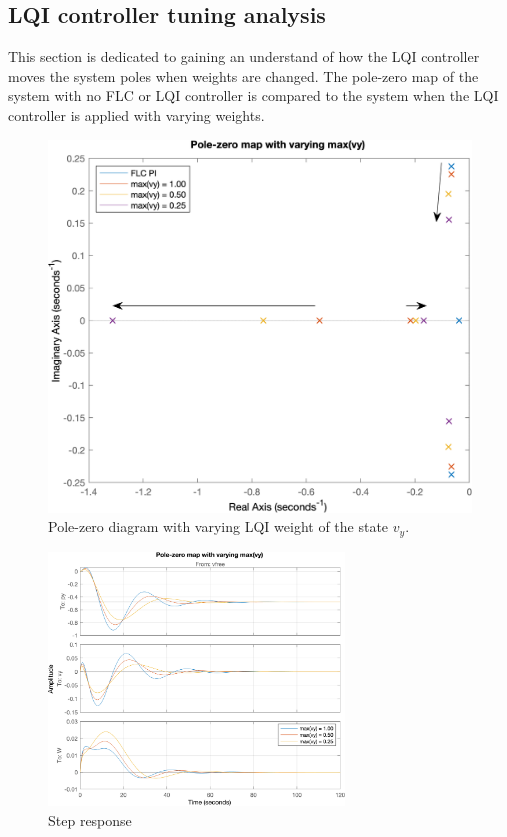 \subsection{LQI controller tuning analysis}
This section is dedicated to gaining an understand of how the LQI controller moves the system poles when weights are changed. The pole-zero map of the system with no FLC or LQI controller is compared to the system when the LQI controller is applied with varying weights.



\begin{figure}[ht]
	\centering
	\includegraphics[width=.55\textwidth]{Graphics/LQI pole zero/02_pzmap_vy}
	\caption{Pole-zero diagram with varying LQI weight of the state $ v_y $.}
	\label{fig:pzmap_vy}
\end{figure}


\begin{figure}[ht]
	\centering
	\includegraphics[width=0.7\textwidth]{Graphics/LQI pole zero/102_step_vy.png}
	\caption{Step response}
	\label{fig:step_vy}
\end{figure}



